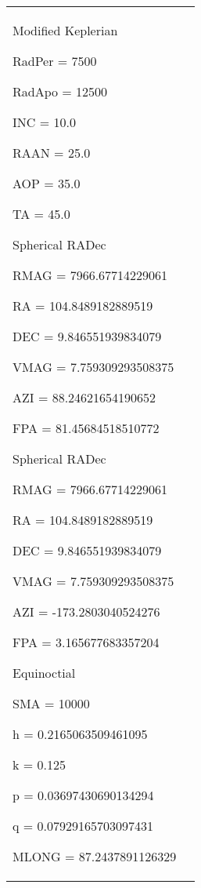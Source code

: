 \begin{table}[htbp!]
\begin{tabular}{|p{1.0 in} |p{5.0 in} |}
\begin{compactenum}
\begin{compactenum}
              \end{compactenum}
              \item Modified Keplerian
               \begin{compactenum}
                  \item RadPer = 7500
                  \item RadApo = 12500
                  \item INC = 10.0
                  \item RAAN = 25.0
                  \item AOP = 35.0
                  \item TA = 45.0
              \end{compactenum}
              \item Spherical RADec
               \begin{compactenum}
                  \item RMAG = 7966.67714229061
                  \item RA = 104.8489182889519
                  \item DEC = 9.846551939834079
                  \item VMAG = 7.759309293508375
                  \item AZI = 88.24621654190652
                  \item FPA = 81.45684518510772
              \end{compactenum}
              \item Spherical RADec
               \begin{compactenum}
                  \item RMAG = 7966.67714229061
                  \item RA = 104.8489182889519
                  \item DEC = 9.846551939834079
                  \item VMAG = 7.759309293508375
                  \item AZI = -173.2803040524276
                  \item FPA = 3.165677683357204
              \end{compactenum}
              \item Equinoctial
               \begin{compactenum}
                  \item SMA = 10000
                  \item h = 0.2165063509461095
                  \item k = 0.125
                  \item p = 0.03697430690134294
                  \item q = 0.07929165703097431
                  \item MLONG = 87.2437891126329
              \end{compactenum}
          \end{compactenum}\\


\end{tabular}
\end{table}

